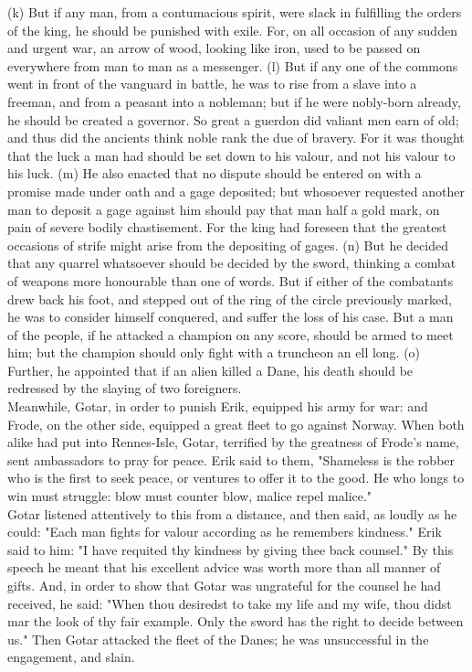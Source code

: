 \documentclass[10pt,a4paper]{report}
\begin{document}
\indent (k) But if any man, from a contumacious spirit, were slack in fulfilling the orders of the king, he should be punished with exile. For, on all occasion of any sudden and urgent war, an arrow of wood, looking like iron, used to be passed on everywhere from man to man as a messenger.
\indent (l) But if any one of the commons went in front of the vanguard in battle, he was to rise from a slave into a freeman, and from a peasant into a nobleman; but if he were nobly-born already, he should be created a governor. So great a guerdon did valiant men earn of old; and thus did the ancients think noble rank the due of bravery. For it was thought that the luck a man had should be set down to his valour, and not his valour to his luck.
\indent (m) He also enacted that no dispute should be entered on with a promise made under oath and a gage deposited; but whosoever requested another man to deposit a gage against him should pay that man half a gold mark, on pain of severe bodily chastisement. For the king had foreseen that the greatest occasions of strife might arise from the depositing of gages.
\indent (n) But he decided that any quarrel whatsoever should be decided by the sword, thinking a combat of weapons more honourable than one of words. But if either of the combatants drew back his foot, and stepped out of the ring of the circle previously marked, he was to consider himself conquered, and suffer the loss of his case. But a man of the people, if he attacked a champion on any score, should be armed to meet him; but the champion should only fight with a truncheon an ell long.
\indent (o) Further, he appointed that if an alien killed a Dane, his death should be redressed by the slaying of two foreigners.\\

Meanwhile, Gotar, in order to punish Erik, equipped his army for war: and Frode, on the other side, equipped a great fleet to go against Norway. When both alike had put into Rennes-Isle, Gotar, terrified by the greatness of Frode's name, sent ambassadors to pray for peace. Erik said to them, "Shameless is the robber who is the first to seek peace, or ventures to offer it to the good. He who longs to win must struggle: blow must counter blow, malice repel malice."\\

Gotar listened attentively to this from a distance, and then said, as loudly as he could: "Each man fights for valour according as he remembers kindness." Erik said to him: "I have requited thy kindness by giving thee back counsel." By this speech he meant that his excellent advice was worth more than all manner of gifts. And, in order to show that Gotar was ungrateful for the counsel he had received, he said: "When thou desiredst to take my life and my wife, thou didst mar the look of thy fair example. Only the sword has the right to decide between us." Then Gotar attacked the fleet of the Danes; he was unsuccessful in the engagement, and slain.\\
\end{document}

